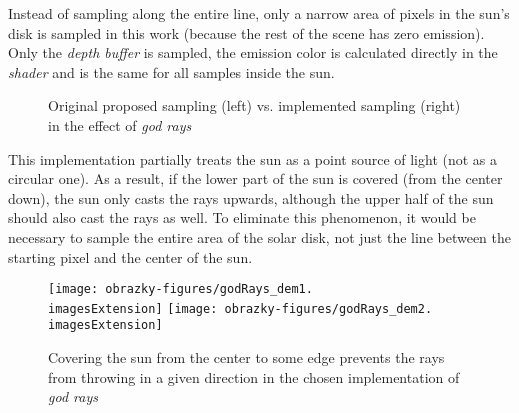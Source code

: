 Instead of sampling along the entire line, only a narrow area of pixels in the sun's disk is sampled in this work (because the rest of the scene has zero emission). Only the \textit{depth buffer} is sampled, the emission color is calculated directly in the \textit{shader} and is the same for all samples inside the sun.

\begin{figure}[H]
	\centering
	\hspace{20mm}
	\caption{Original proposed sampling (left) vs. implemented sampling (right) in the effect of \textit{god rays}}
\end{figure}


This implementation partially treats the sun as a point source of light (not as a circular one). As a result, if the lower part of the sun is covered (from the center down), the sun only casts the rays upwards, although the upper half of the sun should also cast the rays as well. To eliminate this phenomenon, it would be necessary to sample the entire area of the solar disk, not just the line between the starting pixel and the center of the sun.

\begin{figure}[H]
	\texttt{[image: obrazky-figures/godRays\_dem1.\\imagesExtension]}
	\hfill
	\texttt{[image: obrazky-figures/godRays\_dem2.\\imagesExtension]}
	\caption{Covering the sun from the center to some edge prevents the rays from throwing in a given direction in the chosen implementation of \textit{god rays}}
\end{figure}

